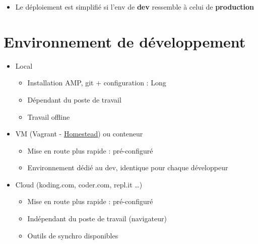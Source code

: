 \begin{english}

\begin{Shaded}
\begin{Highlighting}[]
 
\end{Highlighting}
\end{Shaded}

\end{english}

\begin{itemize}
\tightlist
\item
  Le déploiement est simplifié si l'env de \textbf{dev} ressemble à
  celui de \textbf{production}
\end{itemize}

\hypertarget{environnement-de-duxe9veloppement-1}{%
\section{Environnement de
développement}\label{environnement-de-duxe9veloppement-1}}

\begin{itemize}
\tightlist
\item
  Local

  \begin{itemize}
  \tightlist
  \item
    Installation AMP, git + configuration : Long
  \item
    Dépendant du poste de travail
  \item
    Travail offline
  \end{itemize}
\item
  VM (Vagrant -
  \href{https://laravel.com/docs/5.7/homestead}{Homestead}) ou conteneur

  \begin{itemize}
  \tightlist
  \item
    Mise en route plus rapide : pré-configuré
  \item
    Environnement dédié au dev, identique pour chaque développeur
  \end{itemize}
\item
  Cloud (koding.com, coder.com, repl.it \ldots)

  \begin{itemize}
  \tightlist
  \item
    Mise en route plus rapide : pré-configuré
  \item
    Indépendant du poste de travail (navigateur)
  \item
    Outils de synchro disponibles
  \end{itemize}
\end{itemize}

